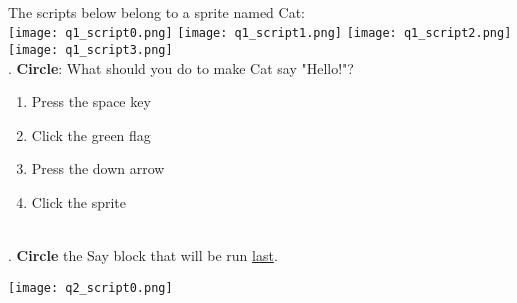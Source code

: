 \noindent \dotfill \\

\noindent The scripts below belong to a sprite named Cat: \\

\texttt{[image: q1\_script0.png]} \hspace{1cm}
\texttt{[image: q1\_script1.png]} \hspace{1cm}
\texttt{[image: q1\_script2.png]} \hspace{1cm}
\texttt{[image: q1\_script3.png]} \hspace{1cm} \\

. \textbf{Circle}: What should you do to make Cat say "Hello!"?
\renewcommand{\theenumi}{\Alph{enumi}}
\begin{enumerate}
\item Press the space key
\item Click the green flag
\item Press the down arrow
\item Click the sprite
\end{enumerate}

\noindent \dotfill \\

. \textbf{Circle} the Say block that will be run \underline{last}.  \\
\begin{center}
\texttt{[image: q2\_script0.png]}
\end{center}

\noindent \dotfill \\